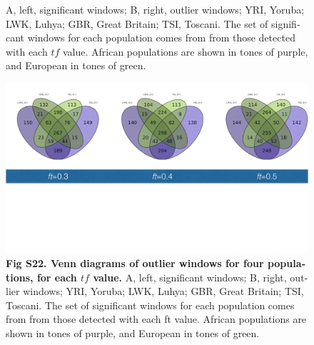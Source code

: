 \begin{refsection}
\begin{otherlanguage}{english}
\begin{figure}
{A, left, significant windows; B, right, outlier windows; YRI, Yoruba; LWK, Luhya; GBR, Great Britain; TSI, Toscani. The set of significant windows for each population comes from from those detected with each $tf$ value. African populations are shown in tones of purple, and European in tones of green.
}
\end{figure}
\begin{figure}
\includegraphics[]{chap2_folder/supp_figures/S22_Fig.png}
\caption*{\textbf{Fig S22. Venn diagrams of outlier windows for four populations, for each $tf$ value. }
A, left, significant windows; B, right, outlier windows; YRI, Yoruba; LWK, Luhya; GBR, Great Britain; TSI, Toscani. The set of significant windows for each population comes from from those detected with each ft value. African populations are shown in tones of purple, and European in tones of green.
}
\end{figure}
%


\end{otherlanguage}
\end{refsection}

